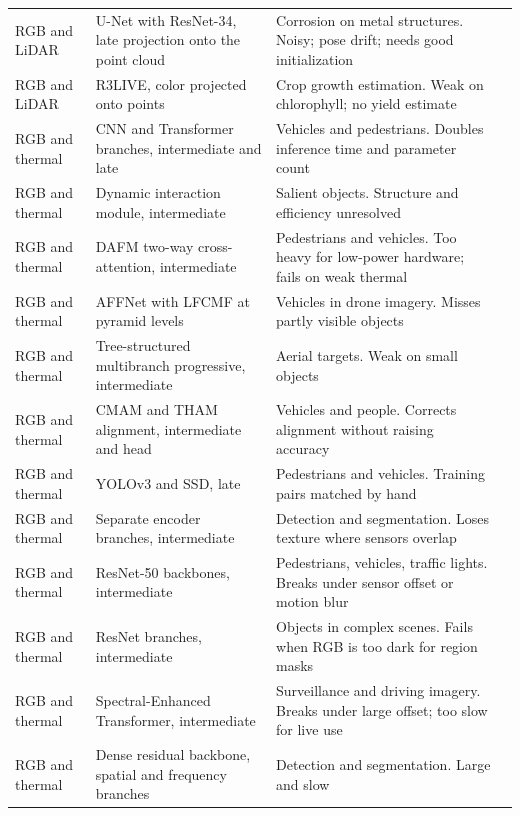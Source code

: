 \begin{xltabular}{\textwidth}{@{}p{2.5cm} X X l@{}}
RGB and LiDAR & U-Net with ResNet-34, late projection onto the point cloud & Corrosion on metal structures. Noisy; pose drift; needs good initialization & \citep{PimenteldeFigueiredo2025} \\
RGB and LiDAR & R3LIVE, color projected onto points & Crop growth estimation. Weak on chlorophyll; no yield estimate & \citep{Tang2025} \\
RGB and thermal & CNN and Transformer branches, intermediate and late & Vehicles and pedestrians. Doubles inference time and parameter count & \citep{Jiang2024} \\
RGB and thermal & Dynamic interaction module, intermediate & Salient objects. Structure and efficiency unresolved & \citep{Gao2026} \\
RGB and thermal & DAFM two-way cross-attention, intermediate & Pedestrians and vehicles. Too heavy for low-power hardware; fails on weak thermal & \citep{Wang2026b} \\
RGB and thermal & AFFNet with LFCMF at pyramid levels & Vehicles in drone imagery. Misses partly visible objects & \citep{Tang2026} \\
RGB and thermal & Tree-structured multibranch progressive, intermediate & Aerial targets. Weak on small objects & \citep{Liu2025a} \\
RGB and thermal & CMAM and THAM alignment, intermediate and head & Vehicles and people. Corrects alignment without raising accuracy & \citep{Liu2025} \\
RGB and thermal & YOLOv3 and SSD, late & Pedestrians and vehicles. Training pairs matched by hand & \citep{Lin2022} \\
RGB and thermal & Separate encoder branches, intermediate & Detection and segmentation. Loses texture where sensors overlap & \citep{Lin2026} \\
RGB and thermal & ResNet-50 backbones, intermediate & Pedestrians, vehicles, traffic lights. Breaks under sensor offset or motion blur & \citep{Zhu2026} \\
RGB and thermal & ResNet branches, intermediate & Objects in complex scenes. Fails when RGB is too dark for region masks & \citep{Xiao2026} \\
RGB and thermal & Spectral-Enhanced Transformer, intermediate & Surveillance and driving imagery. Breaks under large offset; too slow for live use & \citep{Xu2026} \\
RGB and thermal & Dense residual backbone, spatial and frequency branches & Detection and segmentation. Large and slow & \citep{Chen2026a} \\

\end{xltabular}
